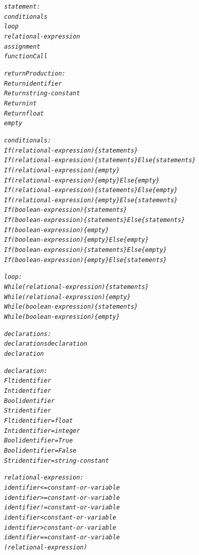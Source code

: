 \documentclass[12pt]{report}
\begin{document}
\begin{alltt}
     \textit{statement:}
          \textit{conditionals}
          \textit{loop}
          \textit{relational-expression}
          \textit{assignment}
          \textit{functionCall}

     \textit{returnProduction:}
          \textit{Return identifier}
          \textit{Return string-constant}
          \textit{Return int}
          \textit{Return float}
          \textit{empty}

     \textit{conditionals:}
          \textit{If ( relational-expression ) \{ statements \}}
          \textit{If ( relational-expression ) \{ statements \} Else \{ statements \}}
          \textit{If ( relational-expression ) \{ empty \}}
          \textit{If ( relational-expression ) \{ empty \} Else \{ empty \}}
          \textit{If ( relational-expression ) \{ statements \} Else \{ empty \}}
          \textit{If ( relational-expression ) \{ empty \} Else \{ statements \}}
          \textit{If ( boolean-expression ) \{ statements \}}
          \textit{If ( boolean-expression ) \{ statements \} Else \{ statements \}}
          \textit{If ( boolean-expression ) \{ empty \}}
          \textit{If ( boolean-expression ) \{ empty \} Else \{ empty \}}
          \textit{If ( boolean-expression ) \{ statements \} Else \{ empty \}}
          \textit{If ( boolean-expression ) \{ empty \} Else \{ statements \}}

     \textit{loop:}
          \textit{While ( relational-expression ) \{ statements \}}
          \textit{While ( relational-expression ) \{ empty \}}
          \textit{While ( boolean-expression ) \{ statements \}}
          \textit{While ( boolean-expression ) \{ empty \}}

     \textit{declarations:}
          \textit{declarations declaration}
          \textit{declaration}

     \textit{declaration:}
          \textit{Flt identifier}
          \textit{Int identifier}
          \textit{Bool identifier}
          \textit{Str identifier}
          \textit{Flt identifier = float}
          \textit{Int identifier = integer}
          \textit{Bool identifier = True}
          \textit{Bool identifier = False}
          \textit{Str identifier = string-constant}

     \textit{relational-expression:}
          \textit{identifier <= constant-or-variable}
          \textit{identifier >= constant-or-variable}
          \textit{identifier != constant-or-variable}
          \textit{identifier < constant-or-variable}
          \textit{identifier > constant-or-variable}
          \textit{identifier == constant-or-variable}
          \textit{( relational-expression )}


\end{alltt}
\end{document}
